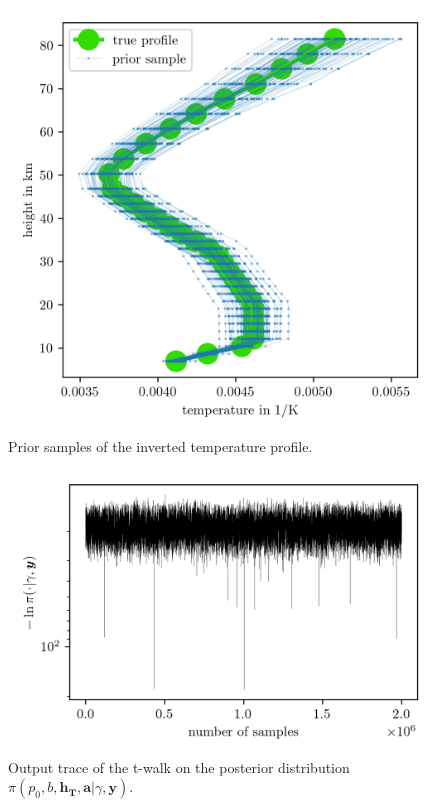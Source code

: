 \begin{figure}[ht!]
	\centering
	\includegraphics{PriorOverTempPost.png}
	\caption[Prior samples of $1/\bm{T}$]{Prior samples of the inverted temperature profile.}
	\label{fig:OverTempPrior}
\end{figure}

\begin{figure}[ht!]
	\centering
	\includegraphics{TraceTwalk.png}
	\caption[T-walk trace]{Output trace of the t-walk on the posterior distribution $\pi(p_0,b,\bm{h_T},\bm{a}| \gamma,\bm{y})$.}
	\label{fig:TraceTwalk}
\end{figure}



